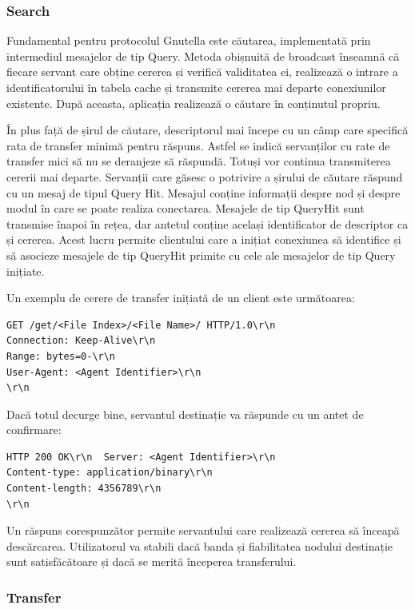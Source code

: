 \subsubsection{Search}

Fundamental pentru protocolul Gnutella este căutarea, implementată prin
intermediul mesajelor de tip Query. Metoda obișnuită de broadcast înseamnă că
fiecare servant care obține cererea și verifică validitatea ei, realizează o
intrare a identificatorului în tabela cache și transmite cererea mai departe
conexiunilor existente. După aceasta, aplicația realizează o căutare în
conținutul propriu.

În plus față de șirul de căutare, descriptorul mai începe cu un câmp care
specifică rata de transfer minimă pentru răspuns. Astfel se indică servanților
cu rate de transfer mici să nu se deranjeze să răspundă. Totuși vor continua
transmiterea cererii mai departe. Servanții care găsesc o potrivire a șirului
de căutare răspund cu un mesaj de tipul Query Hit. Mesajul conține informații
despre nod și despre modul în care se poate realiza conectarea. Mesajele de
tip QueryHit sunt transmise înapoi în rețea, dar antetul conține același
identificator de descriptor ca și cererea. Acest lucru permite clientului care
a inițiat conexiunea să identifice și să asocieze mesajele de tip QueryHit
primite cu cele ale mesajelor de tip Query inițiate.

Un exemplu de cerere de transfer inițiată de un client este următoarea:

\begin{verbatim}
GET /get/<File Index>/<File Name>/ HTTP/1.0\r\n
Connection: Keep-Alive\r\n
Range: bytes=0-\r\n
User-Agent: <Agent Identifier>\r\n
\r\n
\end{verbatim}

Dacă totul decurge bine, servantul destinație va răspunde cu un antet de
confirmare:

\begin{verbatim}
HTTP 200 OK\r\n  Server: <Agent Identifier>\r\n
Content-type: application/binary\r\n
Content-length: 4356789\r\n
\r\n
\end{verbatim}

Un răspuns corespunzător permite servantului care realizează cererea să
înceapă descărcarea. Utilizatorul va stabili dacă banda și fiabilitatea
nodului destinație sunt satisfăcătoare și dacă se merită începerea
transferului.

\subsubsection{Transfer}

